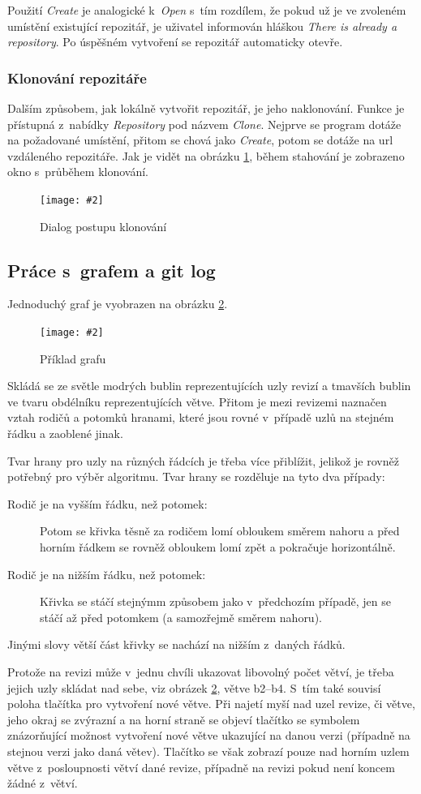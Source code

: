 \documentclass[
  biblatex,
  glossaries,
  index
]{kidiplom}
\newcommand{\pic}[4]{
\begin{figure}[h]
\centering
\texttt{[image: \#2]}
\caption{#3}
\label{fig:#4}
\end{figure}}
\begin{document}
Použití {\it Create} je analogické k~{\it Open} s~tím rozdílem, že pokud už je ve zvoleném umístění existující repozitář, je uživatel informován hláškou {\it There is already a repository}. Po úspěšném vytvoření se repozitář automaticky otevře.

\subsubsection{Klonování repozitáře}
Dalším způsobem, jak lokálně vytvořit repozitář, je jeho naklonování. Funkce je přístupná z~nabídky {\it Repository} pod názvem {\it Clone}. Nejprve se program dotáže na požadované umístění, přitom se chová jako {\it Create}, potom se dotáže na url vzdáleného repozitáře. Jak je vidět na obrázku \ref{fig:clone}, během stahování je zobrazeno okno s~průběhem klonování.


\pic{10cm}{clonning.png}{Dialog postupu klonování}{clone}


\subsection{Práce s~grafem a git log}
Jednoduchý graf je vyobrazen na obrázku \ref{fig:graph}.

\pic{10cm}{graph.png}{Příklad grafu}{graph}

Skládá se ze světle modrých bublin reprezentujících uzly revizí a tmavších bublin ve tvaru obdélníku reprezentujících větve. Přitom je mezi revizemi naznačen vztah rodičů a potomků hranami, které jsou rovné v~případě uzlů na stejném řádku a zaoblené jinak.

Tvar hrany pro uzly na různých řádcích je třeba více přiblížit, jelikož je rovněž potřebný pro výběr algoritmu. Tvar hrany se rozděluje na tyto dva případy:
\begin{description}
\item[Rodič je na vyšším řádku, než potomek:]
Potom se křivka těsně za rodičem lomí obloukem směrem nahoru a před horním řádkem se rovněž obloukem lomí zpět a pokračuje horizontálně.
\item[Rodič je na nižším řádku, než potomek:]
Křivka se stáčí stejnýmm způsobem jako v~předchozím případě, jen se stáčí až před potomkem (a samozřejmě směrem nahoru).
\end{description}
Jinými slovy větší část křivky se nachází na nižším z~daných řádků.

Protože na revizi může v~jednu chvíli ukazovat libovolný počet větví, je třeba jejich uzly skládat nad sebe, viz obrázek \ref{fig:graph}, větve b2--b4. S~tím také souvisí poloha tlačítka pro vytvoření nové větve. Při najetí myší nad uzel revize, či větve, jeho okraj se zvýrazní a na horní straně se objeví tlačítko se symbolem \uv{+} znázorňující možnost vytvoření nové větve ukazující na danou verzi (případně na stejnou verzi jako daná větev). Tlačítko se však zobrazí pouze nad horním uzlem větve z~posloupnosti větví dané revize, případně na revizi pokud není koncem žádné z~větví.
\end{document}
